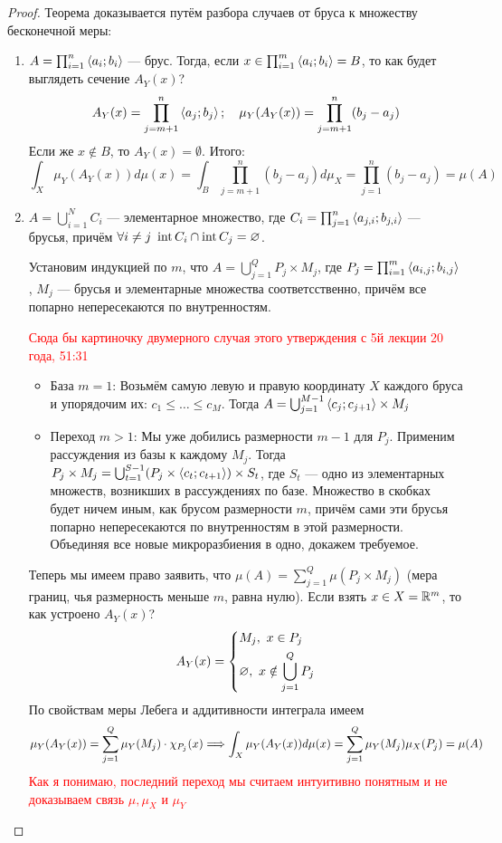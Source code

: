 \begin{proof}
	Теорема доказывается путём разбора случаев от бруса к множеству бесконечной меры:
	\begin{enumerate}
		\item $A = \prod_{i = 1}^n \left\langle a_i; b_i\right\rangle$ --- брус. Тогда, если $x \in \prod_{i = 1}^m \left\langle a_i; b_i\right\rangle = B$, то как будет выглядеть сечение $A_Y(x)$?
		\[
			A_Y(x) = \prod_{j = m + 1}^n \left\langle a_j; b_j\right\rangle;\ \ \ \mu_Y(A_Y(x)) = \prod_{j = m + 1}^n (b_j - a_j)
		\]
		Если же $x \notin B$, то $A_Y(x) = \emptyset$. Итого:
		\[
			\int_X \mu_Y(A_Y(x))d\mu(x) = \int_{B} \prod_{j = m + 1}^n (b_j - a_j)d\mu_X = \prod_{j = 1}^n (b_j - a_j) = \mu(A)
		\]
		
		\item $A = \bigcup_{i = 1}^N C_i$ --- элементарное множество, где $C_i = \prod_{j = 1}^n \left\langle a_{j, i}; b_{j, i}\right\rangle$ --- брусья, причём $\forall i \neq j\ \operatorname{int} C_i \cap \operatorname{int} C_j = \varnothing$.
		
		Установим индукцией по $m$, что $A = \bigcup_{j = 1}^Q P_j \times M_j$, где $P_j = \prod_{i = 1}^m \left\langle a_{i, j}; b_{i, j}\right\rangle$, $M_j$ --- брусья и элементарные множества соответсственно, причём все попарно непересекаются по внутренностям.
		
		\textcolor{red}{Сюда бы картиночку двумерного случая этого утверждения с 5й лекции 20 года, 51:31}
		
		\begin{itemize}
			\item База $m = 1$: Возьмём самую левую и правую координату $X$ каждого бруса и упорядочим их: $c_1 \le \ldots \le c_M$. Тогда $A = \bigcup_{j = 1}^{M - 1} \left\langle c_j; c_{j + 1}\right\rangle \times M_j$
			
			\item Переход $m > 1$: Мы уже добились размерности $m - 1$ для $P_j$. Применим рассуждения из базы к каждому $M_j$. Тогда $P_j \times M_j = \bigcup_{t = 1}^{S - 1} (P_j \times \left\langle c_t; c_{t + 1}\right\rangle) \times S_t$, где $S_t$ --- одно из элементарных множеств, возникших в рассуждениях по базе. Множество в скобках будет ничем иным, как брусом размерности $m$, причём сами эти брусья попарно непересекаются по внутренностям в этой размерности. Объединяя все новые микроразбиения в одно, докажем требуемое.
		\end{itemize}
		Теперь мы имеем право заявить, что $\mu(A) = \sum_{j = 1}^Q \mu(P_j \times M_j)$ (мера границ, чья размерность меньше $m$, равна нулю). Если взять $x \in X = \mathbb{R}^m$, то как устроено $A_Y(x)$?
		\[
			A_Y(x) = \left\{\begin{aligned}
				&{M_j,\ x \in P_j}
				\\
				&{\varnothing,\ x \notin \bigcup_{j = 1}^Q P_j}
			\end{aligned}\right.
		\]
		По свойствам меры Лебега и аддитивности интеграла имеем
		\[
			\mu_Y(A_Y(x)) = \sum_{j = 1}^Q \mu_Y(M_j) \cdot \chi_{P_j}(x) \Longrightarrow \int_X \mu_Y(A_Y(x)) d\mu(x) = \sum_{j = 1}^Q \mu_Y(M_j) \mu_X(P_j) = \mu(A)
		\]
		\textcolor{red}{Как я понимаю, последний переход мы считаем интуитивно понятным и не доказываем связь $\mu, \mu_X$ и $\mu_Y$}
		

\end{enumerate}
\end{proof}
